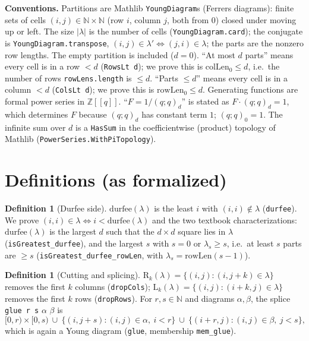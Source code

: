 \documentclass[11pt]{article}
\theoremstyle{definition}
\newtheorem{definition}[theorem]{Definition}
\newcommand{\Rt}{\mathrm{R}}
\newcommand{\Lw}{\mathrm{L}}
\begin{document}
\textbf{Conventions.} Partitions are Mathlib \texttt{YoungDiagram}s (Ferrers diagrams): finite
sets of cells $(i,j)\in\mathbb{N}\times\mathbb{N}$ (row $i$, column $j$, both from $0$) closed
under moving up or left. The size $|\lambda|$ is the number of cells
(\texttt{YoungDiagram.card}); the conjugate is \texttt{YoungDiagram.transpose},
$(i,j)\in\lambda'\iff(j,i)\in\lambda$; the parts are the nonzero row lengths. The empty partition
is included ($d=0$). ``At most $d$ parts'' means every cell is in a row $<d$
(\texttt{RowsLt d}); we prove this is $\mathrm{colLen}_0\le d$, i.e.\ the number of rows
\texttt{rowLens.length} is $\le d$. ``Parts $\le d$'' means every cell is in a column $<d$
(\texttt{ColsLt d}); we prove this is $\mathrm{rowLen}_0\le d$. Generating functions are formal
power series in $\mathbb{Z}[[q]]$. ``$F=1/(q;q)_d$'' is stated as $F\cdot(q;q)_d=1$, which
determines $F$ because $(q;q)_d$ has constant term $1$; $(q;q)_0=1$. The infinite sum over $d$ is a
\texttt{HasSum} in the coefficientwise (product) topology of Mathlib
(\texttt{PowerSeries.WithPiTopology}).

\section{Definitions (as formalized)}

\begin{definition}[Durfee side]
$\mathrm{durfee}(\lambda)$ is the least $i$ with $(i,i)\notin\lambda$ (\texttt{durfee}). We prove
$(i,i)\in\lambda\iff i<\mathrm{durfee}(\lambda)$ and the two textbook characterizations:
$\mathrm{durfee}(\lambda)$ is the largest $d$ such that the $d\times d$ square lies in $\lambda$
(\texttt{isGreatest\_durfee}), and the largest $s$ with $s=0$ or $\lambda_{s}\ge s$, i.e.\ at
least $s$ parts are $\ge s$ (\texttt{isGreatest\_durfee\_rowLen}, with
$\lambda_s=\mathrm{rowLen}(s-1)$).
\end{definition}

\begin{definition}[Cutting and splicing]
$\Rt_k(\lambda)=\{(i,j):(i,j+k)\in\lambda\}$ removes the first $k$ columns (\texttt{dropCols});
$\Lw_k(\lambda)=\{(i,j):(i+k,j)\in\lambda\}$ removes the first $k$ rows (\texttt{dropRows}). For
$r,s\in\mathbb{N}$ and diagrams $\alpha,\beta$, the splice \texttt{glue r s} $\alpha$ $\beta$ is
\[
 [0,r)\times[0,s)\ \cup\ \{(i,j+s):(i,j)\in\alpha,\ i<r\}\ \cup\ \{(i+r,j):(i,j)\in\beta,\ j<s\},
\]
which is again a Young diagram (\texttt{glue}, membership \texttt{mem\_glue}).
\end{definition}
\end{document}

